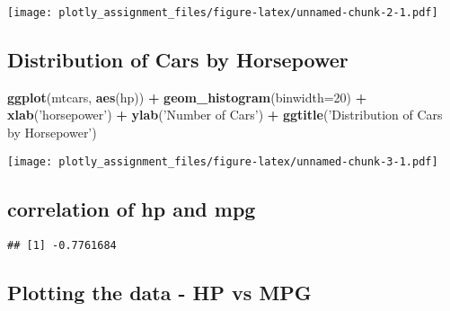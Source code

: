 \documentclass[]{article}
\newenvironment{Shaded}{\begin{snugshade}}{\end{snugshade}}
\newcommand{\DataTypeTok}[1]{\textcolor[rgb]{0.13,0.29,0.53}{#1}}
\newcommand{\DecValTok}[1]{\textcolor[rgb]{0.00,0.00,0.81}{#1}}
\newcommand{\KeywordTok}[1]{\textcolor[rgb]{0.13,0.29,0.53}{\textbf{#1}}}
\newcommand{\NormalTok}[1]{#1}
\newcommand{\OperatorTok}[1]{\textcolor[rgb]{0.81,0.36,0.00}{\textbf{#1}}}
\newcommand{\StringTok}[1]{\textcolor[rgb]{0.31,0.60,0.02}{#1}}
\begin{document}
\texttt{[image: plotly\_assignment\_files/figure-latex/unnamed-chunk-2-1.pdf]}

\hypertarget{distribution-of-cars-by-horsepower}{%
\subsection{Distribution of Cars by
Horsepower}\label{distribution-of-cars-by-horsepower}}

\begin{Shaded}
\begin{Highlighting}[]
\KeywordTok{ggplot}\NormalTok{(mtcars, }\KeywordTok{aes}\NormalTok{(hp)) }\OperatorTok{+}
\StringTok{  }\KeywordTok{geom_histogram}\NormalTok{(}\DataTypeTok{binwidth=}\DecValTok{20}\NormalTok{) }\OperatorTok{+}\StringTok{ }\KeywordTok{xlab}\NormalTok{(}\StringTok{'horsepower'}\NormalTok{) }\OperatorTok{+}\StringTok{ }\KeywordTok{ylab}\NormalTok{(}\StringTok{'Number of Cars'}\NormalTok{) }\OperatorTok{+}
\StringTok{  }\KeywordTok{ggtitle}\NormalTok{(}\StringTok{'Distribution of Cars by Horsepower'}\NormalTok{)}
\end{Highlighting}
\end{Shaded}

\texttt{[image: plotly\_assignment\_files/figure-latex/unnamed-chunk-3-1.pdf]}

\hypertarget{correlation-of-hp-and-mpg}{%
\subsection{correlation of hp and mpg}\label{correlation-of-hp-and-mpg}}

\begin{Shaded}
\end{Shaded}

\begin{verbatim}
## [1] -0.7761684
\end{verbatim}

\hypertarget{plotting-the-data---hp-vs-mpg}{%
\subsection{Plotting the data - HP vs
MPG}\label{plotting-the-data---hp-vs-mpg}}
\end{document}
